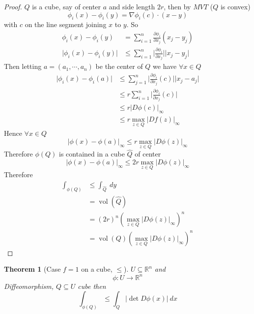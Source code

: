 \documentclass[11pt,openany]{book}
\theoremstyle{plain}
\newtheorem{theorem}{Theorem}[chapter]
\theoremstyle{definition}
\theoremstyle{remark}
\newcommand{\R}{\mathbb{R}}
\newcommand{\vol}{\operatorname{vol}}
\newcommand{\abs}[1]{\lvert #1 \rvert}
\begin{document}
\begin{proof}
    $Q$ is a cube, say of center $a$ and side length $2r$, then by $MVT$ ($Q$ is convex)
    $$\phi_i(x) - \phi_i(y)  = \nabla \phi_i(c) \cdot (x-y)$$
    with $c$ on the line segment joining $x$ to $y$. So 
    \begin{align*}
        \phi_i(x) - \phi_i(y) &= \sum_{i=1}^n \frac{\partial \phi_i}{\partial x_j} (x_j - y_j) \\
        \abs{\phi_i(x) - \phi_i(y)} &\le \sum_{i=1}^n \abs{\frac{\partial \phi_i}{\partial x_j}}\abs{x_j - y_j} 
    \end{align*}
    Then letting $a = (a_1, \cdots, a_n)$ be the center of $Q$ we have $\forall x \in Q$
    \begin{align*}
        \abs{\phi_i(x) - \phi_i(a)} &\le \sum_{j=1}^n \abs{\frac{\partial \phi_i}{\partial x_j} (c)} \abs{x_j-a_j} \\
        &\le r \sum_{i=1}^n \abs{\frac{\partial \phi_i}{\partial x_j} (c)} \\
        &\le r \abs{D\phi(c)}_\infty \\
        &\le r \max_{z \in Q} \abs{Df(z)}_\infty
    \end{align*}
    Hence $\forall x \in Q$
    $$\abs{\phi(x) - \phi(a)}_\infty \le r \max_{z \in Q} \abs{D\phi(z)}_\infty $$
    Therefore $\phi(Q)$ is contained in a cube $\hat{Q}$ of center 
    $$\abs{\phi(x) - \phi(a)}_\infty \le 2 r \max_{z \in Q} \abs{D\phi(z)}_\infty$$
    Therefore 
    \begin{align*}
        \int_{\phi(Q)} &\le \int_{\hat{Q}} \ dy \\
        &= \vol (\hat{Q}) \\
        &= (2r)^n (\max_{z \in Q} \abs{D\phi(z)}_\infty)^n \\
        &= \vol (Q) (\max_{z \in Q} \abs{D\phi(z)}_\infty)^n 
    \end{align*}
\end{proof} 

\begin{theorem}[Case $f = 1$ on a cube, $\le$]
    $U \subseteq \R^n$ and 
    $$\phi \colon U \to \R^n$$ 
    Diffeomorphism, $Q \subseteq U$ cube then 
    $$\int_{\phi(Q)} \le \int_Q \abs{\det D\phi(x)} \ dx$$
\end{theorem}
\end{document}
